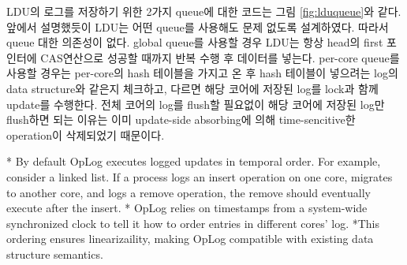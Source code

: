 \ifkor
LDU의 로그를 저장하기 위한 2가지 queue에 대한 코드는 그림 \ref{fig:lduqueue}와 같다. 
앞에서 설명했듯이 LDU는 어떤 queue를 사용해도 문제 없도록 설계하였다.
따라서 queue 대한 의존성이 없다.
global queue를 사용할 경우 LDU는 항상 head의 first 포인터에 CAS연산으로 성공할 때까지 반복 수행 후 데이터를 넣는다. 
per-core queue를 사용할 경우는 per-core의 hash 테이블을 가지고 온 후 hash 테이블이 넣으려는 log의
data structure와 같은지 체크하고, 다르면 해당 코어에 저장된 log를 lock과 함께 update를 수행한다.
전체 코어의 log를 flush할 필요없이 해당 코어에 저장된 log만 flush하면 되는 이유는 이미 update-side absorbing에
의해 time-sencitive한 operation이 삭제되었기 때문이다.

\else

\fi





\ifkor
\else
* By default OpLog executes logged updates in temporal order. For example,
consider a linked list. If a process logs an insert operation on one core,
migrates to another core, and logs a remove operation, the remove should
eventually execute after the insert.
* OpLog relies on timestamps from a system-wide synchronized clock to tell it
how to order entries in different cores' log.
*This ordering ensures linearizaility, making OpLog compatible with existing
data structure semantics.
\fi







